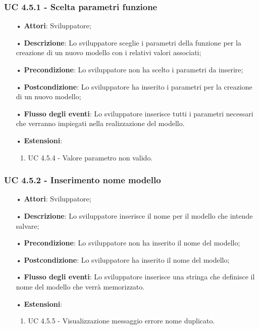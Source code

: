 \subsubsection{UC 4.5.1 - Scelta parametri funzione}
\begin{itemize}
\item[•]\textbf{Attori}: Sviluppatore;
\item[•]\textbf{Descrizione}: Lo sviluppatore sceglie i parametri della funzione per la creazione di un nuovo modello con i relativi valori associati;
\item[•]\textbf{Precondizione}: Lo sviluppatore non ha scelto i parametri da inserire;
\item[•]\textbf{Postcondizione}: Lo sviluppatore ha inserito i parametri per la creazione di un nuovo modello;
\item[•]\textbf{Flusso degli eventi}:  Lo sviluppatore inserisce tutti i parametri necessari che verranno impiegati nella realizzazione del modello.
\item[•] \textbf{Estensioni}: 
\begin{enumerate}
	\item UC 4.5.4 - Valore parametro non valido.
\end{enumerate}
\end{itemize}

\subsubsection{UC 4.5.2 - Inserimento nome modello}
\begin{itemize}
\item[•]\textbf{Attori}: Sviluppatore;
\item[•]\textbf{Descrizione}: Lo sviluppatore inserisce il nome per il modello che intende salvare;
\item[•]\textbf{Precondizione}: Lo sviluppatore non ha inserito il nome del modello;
\item[•]\textbf{Postcondizione}: Lo sviluppatore ha inserito il nome del modello;
\item[•]\textbf{Flusso degli eventi}:  Lo sviluppatore inserisce una stringa che definisce il nome del modello che verrà memorizzato.
\item[•] \textbf{Estensioni}: 
\begin{enumerate}
	\item UC 4.5.5 - Visualizzazione messaggio errore nome duplicato.
\end{enumerate}
\end{itemize}

